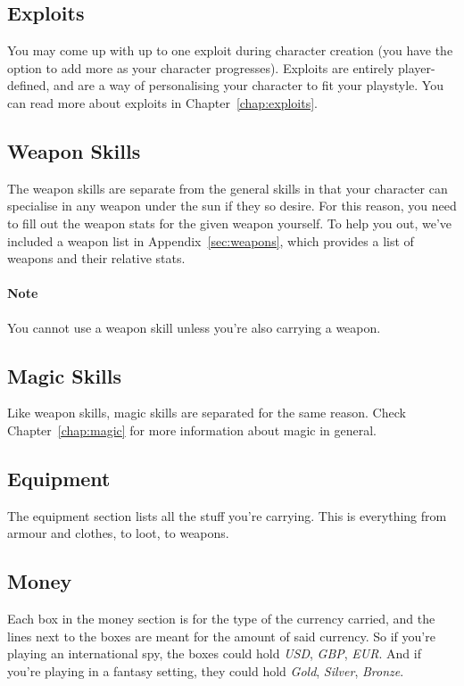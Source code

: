 \subsection{Exploits}
You may come up with up to one exploit during character creation (you have the option to add more as your character progresses).
Exploits are entirely player-defined, and are a way of personalising your character to fit your playstyle.
You can read more about exploits in Chapter~\ref{chap:exploits}.

\subsection{Weapon Skills}
The weapon skills are separate from the general skills in that your character can specialise in any weapon under the sun if they so desire.
For this reason, you need to fill out the weapon stats for the given weapon yourself.
To help you out, we've included a weapon list in Appendix~\ref{sec:weapons}, which provides a list of weapons and their relative stats.

\paragraph{Note} You cannot use a weapon skill unless you're also carrying a weapon.

\subsection{Magic Skills}
Like weapon skills, magic skills are separated for the same reason.
Check Chapter~\ref{chap:magic} for more information about magic in general.

\subsection{Equipment}
The equipment section lists all the stuff you're carrying.
This is everything from armour and clothes, to loot, to weapons.

\subsection{Money}
Each box in the money section is for the type of the currency carried, and the lines next to the boxes are meant for the amount of said currency.
So if you're playing an international spy, the boxes could hold \textit{USD}, \textit{GBP}, \textit{EUR}.
And if you're playing in a fantasy setting, they could hold \textit{Gold}, \textit{Silver}, \textit{Bronze}.